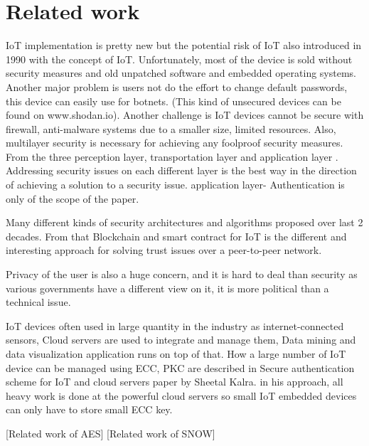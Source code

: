 \documentclass[preprint,12pt,5p]{elsarticle}
\begin{document}
\section{Related work}
IoT implementation is pretty new but the potential risk of IoT also introduced in 1990 with the concept of IoT.\cite{7165580} Unfortunately, most of the device is sold without security measures and old unpatched software and embedded operating systems. Another major problem is users not do the effort to change default passwords,  this device can easily use for botnets. (This kind of unsecured devices can be found on www.shodan.io). Another challenge is IoT devices cannot be secure with firewall, anti-malware systems due to a smaller size, limited resources. Also, multilayer security is necessary for achieving any foolproof security measures. From the three perception layer, transportation layer and application layer \cite{Yang2012}. 
Addressing security issues on each different layer is the best way in the direction of achieving a solution to a security issue. \cite{Jing2014} application layer- Authentication is only of the scope of the paper.  

Many different kinds of security architectures and algorithms proposed over last 2 decades. From that Blockchain and smart contract for IoT is the different and interesting approach for solving trust issues over a peer-to-peer network.\cite{christidis2016blockchains}

Privacy of the user is also a huge concern, and it is hard to deal than security as various governments have a different view on it, it is more political than a technical issue.\cite{Weber2010}

IoT devices often used in large quantity in the industry as internet-connected sensors, Cloud servers are used to integrate and manage them, Data mining and data visualization application runs on top of that.  How a large number of IoT device can be managed using ECC, PKC are described in Secure authentication scheme for IoT and cloud servers paper by Sheetal Kalra. in his approach, all heavy work is done at the powerful cloud servers so small IoT embedded devices can only have to store small ECC key. \cite{Kalra2015}

[Related work of AES]
[Related work of SNOW]





\end{document}
